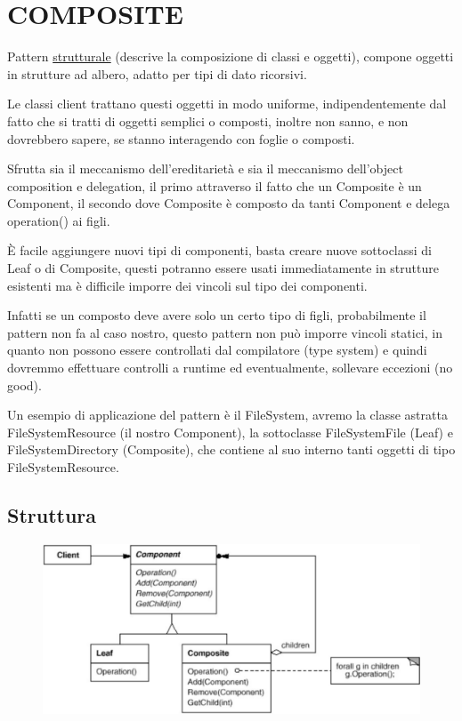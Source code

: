 \chapter{COMPOSITE}

Pattern \underline{strutturale} (descrive la composizione di classi e oggetti), compone oggetti in strutture ad albero, adatto per tipi di dato ricorsivi.

Le classi client trattano questi oggetti in modo uniforme, indipendentemente dal fatto che si tratti di oggetti semplici o composti, inoltre non sanno, e non 
dovrebbero sapere, se stanno interagendo con foglie o composti.

Sfrutta sia il meccanismo dell'ereditarietà e sia il meccanismo dell'object composition e delegation, il primo attraverso il fatto che un Composite è un Component, 
il secondo dove Composite è composto da tanti Component e delega operation() ai figli.

È facile aggiungere nuovi tipi di componenti, basta creare nuove sottoclassi di Leaf o di Composite, questi potranno essere usati immediatamente in strutture 
esistenti ma è difficile imporre dei vincoli sul tipo dei componenti.

Infatti se un composto deve avere solo un certo tipo di figli, probabilmente il pattern non fa al caso nostro, questo pattern non può imporre vincoli statici, in 
quanto non possono essere controllati dal compilatore (type system) e quindi dovremmo effettuare controlli a runtime ed eventualmente, sollevare eccezioni (no good).

Un esempio di applicazione del pattern è il FileSystem, avremo la classe astratta FileSystemResource (il nostro Component), la sottoclasse FileSystemFile (Leaf) e 
FileSystemDirectory (Composite), che contiene al suo interno tanti oggetti di tipo FileSystemResource.

\section{Struttura}

\begin{figure}[H]
    \centering
    \includegraphics[width=0.5\linewidth]{../../immagini/composite/struttura_composite}
\end{figure}

